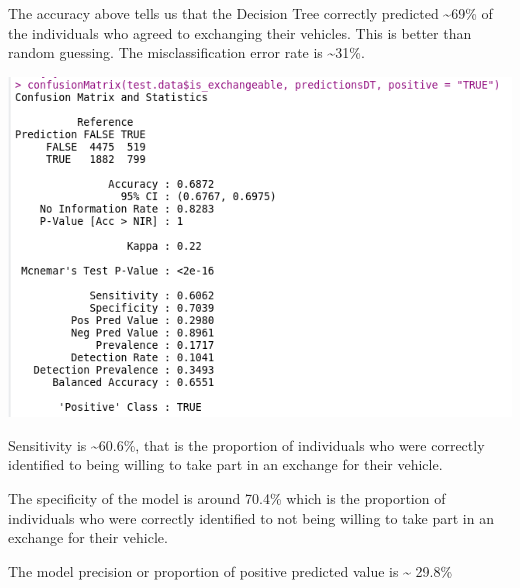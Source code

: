 \documentclass[
]{article}
\begin{document}
The accuracy above tells us that the Decision Tree correctly predicted
\textasciitilde69\% of the individuals who agreed to exchanging their
vehicles. This is better than random guessing. The misclassification
error rate is \textasciitilde31\%.

\includegraphics{images/Exchange QS/Decision Tree/DTCMPredictive.PNG}

Sensitivity is \textasciitilde60.6\%, that is the proportion of
individuals who were correctly identified to being willing to take part
in an exchange for their vehicle.

The specificity of the model is around 70.4\% which is the proportion of
individuals who were correctly identified to not being willing to take
part in an exchange for their vehicle.

The model precision or proportion of positive predicted value is
\textasciitilde{} 29.8\%
\end{document}
